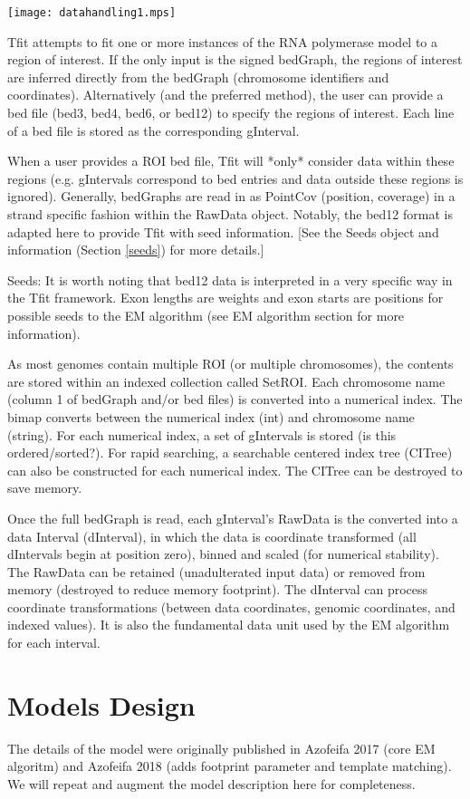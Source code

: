 \documentclass[11pt]{article}
\begin{document}
\texttt{[image: datahandling1.mps]}

Tfit attempts to fit one or more instances of the RNA polymerase model to a 
region of interest.  If the only input is the signed bedGraph, the regions of 
interest are inferred directly from the bedGraph (chromosome identifiers 
and coordinates).  Alternatively (and the preferred method), the user can 
provide a bed file (bed3, bed4, bed6, or bed12) to specify the regions of 
interest.  Each line of a bed file is stored as the corresponding gInterval.

When a user provides a ROI bed file, Tfit will *only* consider data within 
these regions (e.g. gIntervals correspond to bed entries and data outside these 
regions is ignored).  Generally, bedGraphs are read in as PointCov (position, 
coverage) in a strand specific fashion within the RawData object.  Notably,
the bed12 format is adapted here to provide Tfit with seed information.  [See
the Seeds object and information (Section \ref{seeds}) for more details.]

Seeds: It is worth noting that bed12 data is interpreted in a very specific way
in the Tfit framework.   Exon lengths are weights and exon starts are 
positions for possible seeds to the EM algorithm (see EM algorithm 
section for more information).

As most genomes contain multiple ROI (or multiple chromosomes), the contents
are stored within an indexed collection called SetROI.  Each chromosome name 
(column 1 of bedGraph and/or bed files) is converted into a numerical index.
The bimap converts between the numerical index (int) and chromosome name (string).
For each numerical index, a set of gIntervals is stored (is this ordered/sorted?). 
For rapid searching, a searchable centered index tree (CITree) can also be 
constructed for each numerical index.  The CITree can be destroyed to save 
memory.  

Once the full bedGraph is read, each gInterval's RawData is the converted into
a data Interval (dInterval), in which the data is coordinate transformed (all
dIntervals begin at position zero), binned and scaled (for numerical
stability).  The RawData can be retained (unadulterated input data) or removed 
from memory (destroyed to reduce memory footprint).  The dInterval can 
process coordinate transformations (between data coordinates, genomic 
coordinates, and indexed values).  It is also the fundamental data unit 
used by the EM algorithm for each interval.

\clearpage
\section{Models Design}
The details of the model were originally published in Azofeifa 2017 (core EM
    algoritm) and Azofeifa 2018 (adds footprint parameter and template matching).  
We will repeat and augment the model description here for
completeness. 
\end{document}
